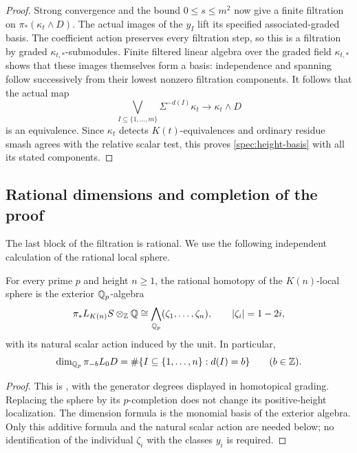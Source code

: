 \begin{proof}
Strong convergence and the bound \(0\leq s\leq m^2\) now give a
finite filtration on \(\pi_*(\kappa_t\wedge D)\). The actual
images of the \(y_I\) lift its specified associated-graded basis.
The coefficient action preserves every filtration step, so this is a
filtration by graded \(\kappa_{t,*}\)-submodules.
Finite filtered linear algebra over the graded field
\(\kappa_{t,*}\) shows that these images themselves form a basis:
independence and spanning follow successively from their lowest
nonzero filtration components. It follows that the actual map
\[
\bigvee_{I\subseteq\{1,\ldots,m\}}
 \Sigma^{-d(I)}\kappa_t
\longrightarrow\kappa_t\wedge D
\]
is an equivalence. Since \(\kappa_t\) detects
\(K(t)\)-equivalences and ordinary residue smash agrees with the
relative scalar test, this proves \eqref{spec:height-basis} with all
its stated components.
\end{proof}

\subsection{Rational dimensions and completion of the proof}

The last block of the filtration is rational. We use the following
independent calculation of the rational local sphere.

\begin{theorem}
\label{thm:rational-sphere}
For every prime \(p\) and height \(n\geq1\), the rational homotopy
of the \(K(n)\)-local sphere is the exterior \(\mathbb Q_p\)-algebra
\[
\pi_*L_{K(n)}S\otimes_{\mathbb Z}\mathbb Q
\cong\bigwedge_{\mathbb Q_p}(\zeta_1,\ldots,\zeta_n),
\qquad |\zeta_i|=1-2i,
\]
with its natural scalar action induced by the unit. In particular,
\begin{equation}
\dim_{\mathbb Q_p}\pi_{-b}L_0D
 =\#\{I\subseteq\{1,\ldots,n\}:d(I)=b\}
\qquad(b\in\mathbb Z).
\label{spec:rational-dimensions}
\end{equation}
\end{theorem}

\begin{proof}
This is \cite[Theorem~A]{BSSW}, with the generator degrees displayed
in homotopical grading. Replacing the sphere by its \(p\)-completion
does not change its positive-height localization. The dimension
formula is the monomial basis of the exterior algebra. Only this
additive formula and the natural scalar action are needed below; no
identification of the individual \(\zeta_i\) with the classes
\(y_i\) is required.
\end{proof}

